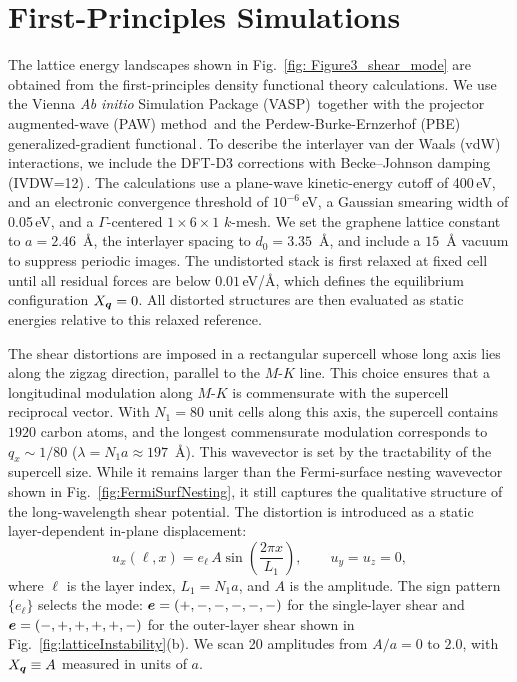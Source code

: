 \documentclass[aps,prx,article,twocolumn,amsmath,amssymb,superscriptaddress,longbibliography]{revtex4-2}
\begin{document}
\section{First-Principles Simulations}\label{app:DFT}
The lattice energy landscapes shown in Fig.~\ref{fig: Figure3_shear_mode} are obtained from the first-principles density functional theory calculations. We use the Vienna {\it Ab initio} Simulation Package (VASP)\,\cite{kresse_efficiency_1996,kresse_efficiency_1996} together with the projector augmented-wave (PAW) method\,\cite{paw} and the Perdew-Burke-Ernzerhof (PBE) generalized-gradient functional\,\cite{perdew1996}. To describe the interlayer van der Waals (vdW) interactions, we include the DFT-D3 corrections with Becke--Johnson damping (IVDW=12)\,\cite{grimme2010,grimme2011}. The calculations use a plane-wave kinetic-energy cutoff of 400\,eV, and an electronic convergence threshold of $10^{-6}$\,eV, a Gaussian smearing width of 0.05\,eV, and a $\Gamma$-centered $1\times6\times1$ $k$-mesh. We set the graphene lattice constant to $a=2.46$~\AA, the interlayer spacing to $d_0=3.35$~\AA, and include a $15$~\AA{} vacuum to suppress periodic images. The undistorted stack is first relaxed at fixed cell until all residual forces are below $0.01$\,eV/\AA, which defines the equilibrium configuration $X_{\vb*{q}}=0$. All distorted structures are then evaluated as static energies relative to this relaxed reference.

The shear distortions are imposed in a rectangular supercell whose long axis lies along the zigzag direction, parallel to the $M$-$K$ line. This choice ensures that a longitudinal modulation along $M$-$K$ is commensurate with the supercell reciprocal vector. With $N_1=80$ unit cells along this axis, the supercell contains $1920$ carbon atoms, and the longest commensurate modulation corresponds to $q_x\sim1/80$ ($\lambda=N_1 a\approx197$~\AA). This wavevector is set by the tractability of the  supercell size. While it remains larger than the Fermi-surface nesting wavevector shown in Fig.~\ref{fig:FermiSurfNesting}, it still captures the qualitative structure of the long-wavelength shear potential. The distortion is introduced as a static layer-dependent in-plane displacement:
\begin{equation}
u_x(\ell, x) = e_\ell\, A \sin\left(\frac{2\pi x}{L_1} \right), \qquad u_y=u_z=0,
\label{eq:appShearDisplacement}
\end{equation}
where $\ell$ is the layer index, $L_1=N_1 a$, and $A$ is the amplitude. The sign pattern $\{e_\ell\}$ selects the mode: $\vb*{e}=(+,-,-,-,-,-)$ for the single-layer shear and $\vb*{e}=(-,+,+,+,+,-)$ for the outer-layer shear shown in Fig.~\ref{fig:latticeInstability}(b). We scan 20 amplitudes from $A/a=0$ to $2.0$, with $X_{\vb*{q}}\equiv A$ measured in units of $a$.
\end{document}
